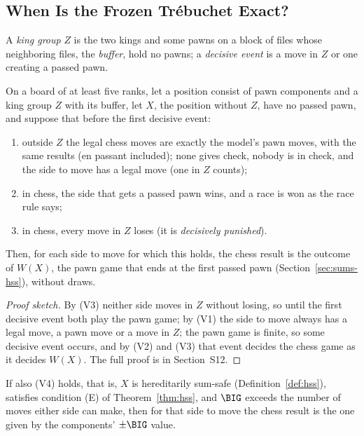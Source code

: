 \subsection{When Is the Frozen Tr\'ebuchet Exact?}\label{sec:kings-valid}

A \emph{king group} $Z$ is the two kings and some pawns on a block of files whose neighboring files, the
\emph{buffer}, hold no pawns; a \emph{decisive event} is a move in $Z$ or one creating a passed pawn.

\begin{theorem}\label{thm:validity}
On a board of at least five ranks, let a position consist of pawn components and a king group $Z$ with its buffer, let $X$, the position without $Z$, have no passed pawn, and suppose that before the
first decisive event:
\begin{enumerate}
\item[(V1)] outside $Z$ the legal chess moves are exactly the model's pawn moves, with the same results (en
  passant included); none gives check, nobody is in check, and the side to move has a legal move (one in $Z$
  counts);
\item[(V2)] in chess, the side that gets a passed pawn wins, and a race is won as the race rule says;
\item[(V3)] in chess, every move in $Z$ loses (it is \emph{decisively punished}).
\end{enumerate}
Then, for each side to move for which this holds, the chess result is the outcome of $W(X)$, the pawn game that ends at the first
passed pawn (Section~\ref{sec:sums-hss}), without draws.
\end{theorem}

\begin{proof}[Proof sketch]
By (V3) neither side moves in $Z$ without losing, so until the first decisive event both play the pawn game;
by (V1) the side to move always has a legal move, a pawn move or a move in $Z$; the pawn game is finite, so some
decisive event occurs, and by (V2) and (V3) that event decides the chess game as it decides $W(X)$. The full
proof is in Section~S12.
\end{proof}

\begin{corollary}[\lab{S}]\label{cor:v4}
If also (V4) holds, that is, $X$ is hereditarily sum-safe (Definition~\ref{def:hss}), satisfies condition (E) of
Theorem~\ref{thm:hss}, and $\BIG$ exceeds the number of moves either side can make, then for that side to move
the chess result is the one given by the components' $\pm\BIG$ value.
\end{corollary}

